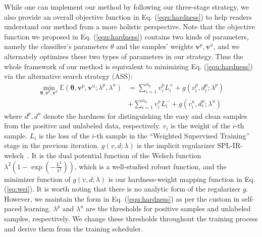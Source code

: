 \documentclass[sigconf]{acmart}
\begin{document}
While one can implement our method by following our three-stage strategy, we also provide an overall objective function in Eq. (\ref{equ:hardness}) to help readers understand our method from a more holistic perspective. Note that the objective function we proposed in Eq. (\ref{equ:hardness}) contains two kinds of parameters, namely the classifier's parameters $\theta$ and the samples' weights $\mathbf{v}^p, \mathbf{v}^u$, and we alternately optimizes these two types of parameters in our strategy. Thus the whole framework of our method is equivalent to minimizing Eq. (\ref{equ:hardness}) via the alternative search strategy (ASS):
\begin{align}
    \min_{\mathbf{\theta},\mathbf{v}^p, \mathbf{v}^u}\mathbb{E}(\mathbf{\theta},\mathbf{v}^p, \mathbf{v}^u;\lambda^p, \lambda^u)&=\sum_{i=1}^{n_p} v^p_i L^+_i+g(v^p_i, d^p_i;\lambda^p)\label{equ:hardness}\\
    &+\sum_{i=1}^{n_u} v^u_i L^-_i+g(v^u_i,d^u_i;\lambda^u)\nonumber
\end{align}
where $d^p, d^u$ denote the hardness for distinguishing the easy and clean samples from the positive and unlabeled data, respectively. $v_i$ is the weight of the $i$-th sample. $L_i$ is the loss of the $i$-th sample in the ``Weighted Supervised Training'' stage in the previous iteration. $g(v,d;\lambda)$ is the implicit regularizer SPL-IR-welsch~\cite{fan2017self}. It is the dual potential function of the Welsch function $\lambda^2\left(1-\exp\left(-\frac{L^2}{\lambda^2}\right)\right)$, which is a well-studied robust function, and the minimizer function of $g(v,d;\lambda)$ is our hardness-weight mapping function in Eq. (\ref{eq:wei}).  It is worth noting that there is no analytic form of the regularizer $g$. However, we maintain the form in Eq. (\ref{equ:hardness}) as per the custom in self-paced learning. $\lambda^p$ and $\lambda^u$ are the thresholds for positive samples and unlabeled samples, respectively. We change these thresholds throughout the training process and derive them from the training scheduler.


\end{document}

